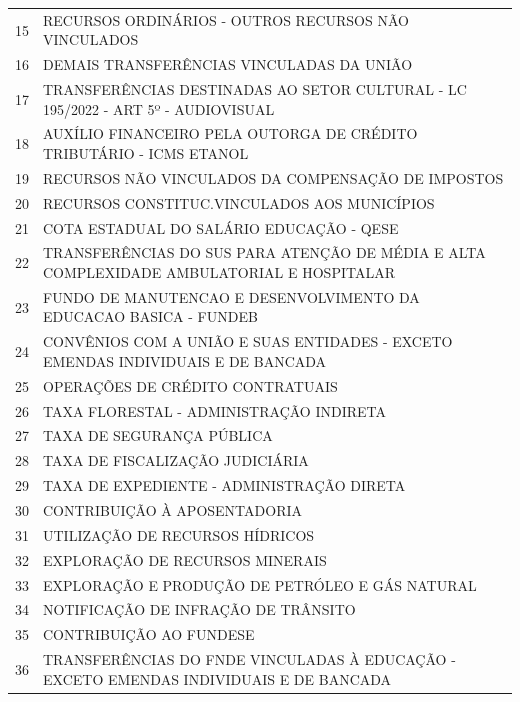 \documentclass{article}
\begin{document}
\begin{longtable}[c]{m{1cm}|m{11cm}}
\multicolumn{1}{c|}{ 15 } & RECURSOS ORDINÁRIOS - OUTROS RECURSOS NÃO VINCULADOS \\
\multicolumn{1}{c|}{ 16 } & DEMAIS TRANSFERÊNCIAS VINCULADAS DA UNIÃO \\
\multicolumn{1}{c|}{ 17 } & TRANSFERÊNCIAS DESTINADAS AO SETOR CULTURAL - LC 195/2022 - ART 5º - AUDIOVISUAL \\
\multicolumn{1}{c|}{ 18 } & AUXÍLIO FINANCEIRO PELA OUTORGA DE CRÉDITO TRIBUTÁRIO - ICMS ETANOL \\
\multicolumn{1}{c|}{ 19 } & RECURSOS NÃO VINCULADOS DA COMPENSAÇÃO DE IMPOSTOS \\
\multicolumn{1}{c|}{ 20 } & RECURSOS CONSTITUC.VINCULADOS AOS MUNICÍPIOS \\
\multicolumn{1}{c|}{ 21 } & COTA ESTADUAL DO SALÁRIO EDUCAÇÃO - QESE \\
\multicolumn{1}{c|}{ 22 } & TRANSFERÊNCIAS DO SUS PARA ATENÇÃO DE MÉDIA E ALTA COMPLEXIDADE AMBULATORIAL E HOSPITALAR \\
\multicolumn{1}{c|}{ 23 } & FUNDO DE MANUTENCAO E DESENVOLVIMENTO DA EDUCACAO BASICA - FUNDEB \\
\multicolumn{1}{c|}{ 24 } & CONVÊNIOS COM A UNIÃO E SUAS ENTIDADES - EXCETO EMENDAS INDIVIDUAIS E DE BANCADA \\
\multicolumn{1}{c|}{ 25 } & OPERAÇÕES DE CRÉDITO CONTRATUAIS \\
\multicolumn{1}{c|}{ 26 } & TAXA FLORESTAL - ADMINISTRAÇÃO INDIRETA \\
\multicolumn{1}{c|}{ 27 } & TAXA DE SEGURANÇA PÚBLICA \\
\multicolumn{1}{c|}{ 28 } & TAXA DE FISCALIZAÇÃO JUDICIÁRIA \\
\multicolumn{1}{c|}{ 29 } & TAXA DE EXPEDIENTE - ADMINISTRAÇÃO DIRETA \\
\multicolumn{1}{c|}{ 30 } & CONTRIBUIÇÃO À APOSENTADORIA \\
\multicolumn{1}{c|}{ 31 } & UTILIZAÇÃO DE RECURSOS HÍDRICOS \\
\multicolumn{1}{c|}{ 32 } & EXPLORAÇÃO DE RECURSOS MINERAIS \\
\multicolumn{1}{c|}{ 33 } & EXPLORAÇÃO E PRODUÇÃO DE PETRÓLEO E GÁS NATURAL \\
\multicolumn{1}{c|}{ 34 } & NOTIFICAÇÃO DE INFRAÇÃO DE TRÂNSITO \\
\multicolumn{1}{c|}{ 35 } & CONTRIBUIÇÃO AO FUNDESE \\
\multicolumn{1}{c|}{ 36 } & TRANSFERÊNCIAS DO FNDE VINCULADAS À EDUCAÇÃO - EXCETO EMENDAS INDIVIDUAIS E DE BANCADA \\

\end{longtable}
\end{document}
